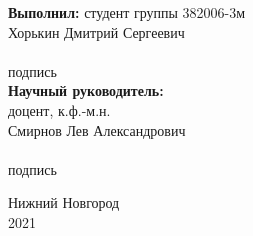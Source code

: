 \begin{titlepage}
\begin{minipage}[t]{.36\linewidth}
\begin{flushleft}
			\textbf{Выполнил:} студент группы 382006-3м \\
			Хорькин Дмитрий Сергеевич\\
			\vspace{1.0em}
			\hrulefill  \\
			{\small подпись}\\
			
			\vspace{1.5em}
			\textbf{Научный руководитель:}\\
		доцент, к.ф.-м.н.\\
			Смирнов Лев Александрович\\
			\vspace{1.0em}
			\hrulefill  \\
			{\small подпись}
			
    	\end{flushleft}
    \end{minipage}

	\vspace{\fill}

	\begin{center}
		Нижний Новгород \\
		2021
	\end{center}

\end{titlepage}